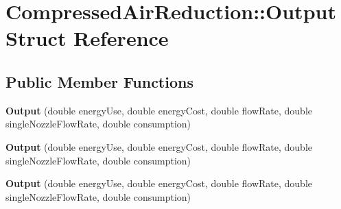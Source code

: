 \hypertarget{struct_compressed_air_reduction_1_1_output}{}\section{Compressed\+Air\+Reduction\+:\+:Output Struct Reference}
\label{struct_compressed_air_reduction_1_1_output}
\subsection*{Public Member Functions}
\begin{DoxyCompactItemize}
\item 
\mbox{\label{struct_compressed_air_reduction_1_1_output_a24985a55672d78bc4dacacec923cd25b}} 
{\bfseries Output} (double energy\+Use, double energy\+Cost, double flow\+Rate, double single\+Nozzle\+Flow\+Rate, double consumption)
\item 
\mbox{\label{struct_compressed_air_reduction_1_1_output_a24985a55672d78bc4dacacec923cd25b}} 
{\bfseries Output} (double energy\+Use, double energy\+Cost, double flow\+Rate, double single\+Nozzle\+Flow\+Rate, double consumption)
\item 
\mbox{\label{struct_compressed_air_reduction_1_1_output_a24985a55672d78bc4dacacec923cd25b}} 
{\bfseries Output} (double energy\+Use, double energy\+Cost, double flow\+Rate, double single\+Nozzle\+Flow\+Rate, double consumption)
\end{DoxyCompactItemize}
